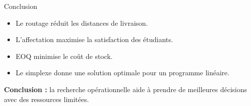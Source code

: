 \documentclass[aspectratio=169]{beamer}
\begin{document}
\begin{frame}{Conclusion}
\begin{itemize}
\item Le routage réduit les distances de livraison.
\item L'affectation maximise la satisfaction des étudiants.
\item EOQ minimise le coût de stock.
\item Le simplexe donne une solution optimale pour un programme linéaire.
\end{itemize}
\vspace{0.3cm}
\textbf{Conclusion :} la recherche opérationnelle aide à prendre de meilleures décisions avec des ressources limitées.
\end{frame}
\end{document}
